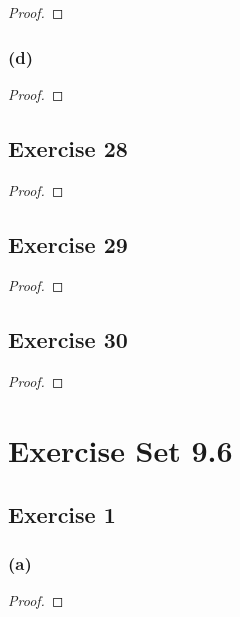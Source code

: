 \documentclass[14pt]{extarticle}
\begin{document}
\begin{proof}

\end{proof}

\subsubsection{(d)}

\begin{proof}

\end{proof}

\subsection{Exercise 28}

\begin{proof}

\end{proof}

\subsection{Exercise 29}

\begin{proof}

\end{proof}

\subsection{Exercise 30}

\begin{proof}

\end{proof}

\section{Exercise Set 9.6}

\subsection{Exercise 1}

\subsubsection{(a)}

\begin{proof}

\end{proof}
\end{document}
